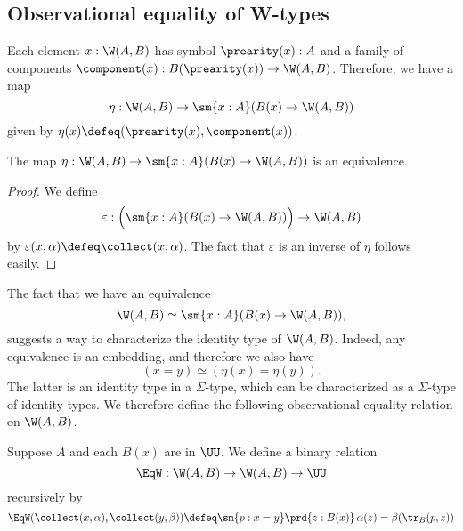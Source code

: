 \subsection{Observational equality of W-types}


Each element $x:\W(A,B)$ has symbol $\prearity(x):A$ and a family of components $\component(x):B(\prearity(x))\to\W(A,B)$. Therefore, we have a map
\begin{equation*}
  \eta : \W(A,B)\to \sm{x:A}(B(x)\to\W(A,B))
\end{equation*}
given by $\eta(x)\defeq(\prearity(x),\component(x))$.

\begin{prp}\label{prp:algebra-W}
  The map $\eta:\W(A,B)\to\sm{x:A}(B(x)\to\W(A,B))$ is an equivalence.
\end{prp}

\begin{proof}
  We define
  \begin{equation*}
    \varepsilon : \Big(\sm{x:A}(B(x)\to\W(A,B))\Big)\to\W(A,B)
  \end{equation*}
  by $\varepsilon(x,\alpha)\defeq\collect(x,\alpha)$. The fact that $\varepsilon$ is an inverse of $\eta$ follows easily.
\end{proof}

The fact that we have an equivalence
\begin{equation*}
  \W(A,B)\simeq\sm{x:A}(B(x)\to\W(A,B)),
\end{equation*}
suggests a way to characterize the identity type of $\W(A,B)$. Indeed, any equivalence is an embedding, and therefore we also have
\begin{equation*}
  (x=y)\simeq (\eta(x)=\eta(y)).
\end{equation*}
The latter is an identity type in a $\Sigma$-type, which can be characterized as a $\Sigma$-type of identity types. We therefore define the following observational equality relation on $\W(A,B)$.

\begin{defn}
  Suppose $A$ and each $B(x)$ are in $\UU$. We define a binary relation
  \begin{equation*}
    \EqW : \W(A,B)\to \W(A,B)\to \UU
  \end{equation*}
  recursively by
  \begin{equation*}
    \EqW(\collect(x,\alpha),\collect(y,\beta)) \defeq \sm{p:x=y}\prd{z:B(x)}\,\alpha(z)=\beta(\tr_B(p,z))%
  \end{equation*}
\end{defn}

